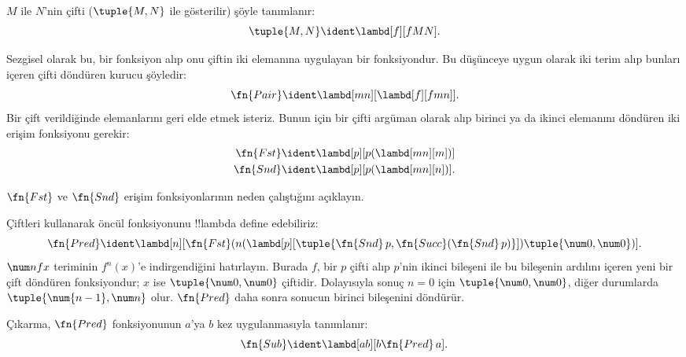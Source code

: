 


\begin{defn}
$M$ ile $N$'nin çifti ($\tuple{M,N}$ ile gösterilir) şöyle tanımlanır:
\[
\tuple{M,N} \ident \lambd[f][fMN].
\]
\end{defn}

Sezgisel olarak bu, bir fonksiyon alıp onu çiftin iki elemanına uygulayan bir
fonksiyondur. Bu düşünceye uygun olarak iki terim alıp bunları içeren çifti
döndüren kurucu şöyledir:
\[
  \fn{Pair} \ident \lambd[mn][\lambd[f][fmn]].
\]
Bir çift verildiğinde elemanlarını geri elde etmek isteriz. Bunun için bir
çifti argüman olarak alıp birinci ya da ikinci elemanını döndüren iki erişim
fonksiyonu gerekir:
\begin{align*}
  \fn{Fst} & \ident \lambd[p][p(\lambd[mn][m])]\\
  \fn{Snd} & \ident \lambd[p][p(\lambd[mn][n])].
\end{align*}

\begin{prob}
  $\fn{Fst}$ ve $\fn{Snd}$ erişim fonksiyonlarının neden çalıştığını
  açıklayın.
\end{prob}

Çiftleri kullanarak öncül fonksiyonunu !!{lambda define} edebiliriz:
\[
  \fn{Pred} \ident \lambd[n][\fn{Fst}(n (\lambd[p][\tuple{\fn{Snd}\, {p}, \fn{Succ}(\fn{Snd}\, {p})}]) \tuple{\num 0, \num 0})].
\]
$\num n f x$ teriminin $f^n(x)$'e indirgendiğini hatırlayın. Burada $f$, bir
$p$ çifti alıp $p$'nin ikinci bileşeni ile bu bileşenin ardılını içeren yeni
bir çift döndüren fonksiyondur; $x$ ise $\tuple{\num0,\num0}$ çiftidir.
Dolayısıyla sonuç $n=0$ için $\tuple{\num0,\num0}$, diğer durumlarda
$\tuple{\num{n-1},\num n}$ olur. $\fn{Pred}$ daha sonra sonucun birinci
bileşenini döndürür.

Çıkarma, $\fn{Pred}$ fonksiyonunun $a$'ya $b$ kez uygulanmasıyla tanımlanır:
\[
\fn{Sub} \ident \lambd[ab][b \fn{Pred}\, a].
\]

